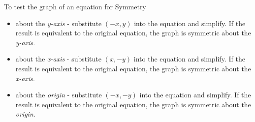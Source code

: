 \begin{definition}
    To test the graph of an equation for Symmetry
    \begin{itemize}
        \item about the \textit{y-axis} - substitute $(-x, y)$ into the equation and simplify. If the result is equivalent to the original equation, the graph is symmetric about the \textit{y-axis}.
        \item about the \textit{x-axis} - substitute $(x, -y)$ into the equation and simplify. If the result is equivalent to the original equation, the graph is symmetric about the \textit{x-axis}.
        \item about the \textit{origin} - substitute $(-x, -y)$ into the equation and simplify. If the result is equivalent to the original equation, the graph is symmetric about the \textit{origin}.
    \end{itemize}
\end{definition}
\newpage

